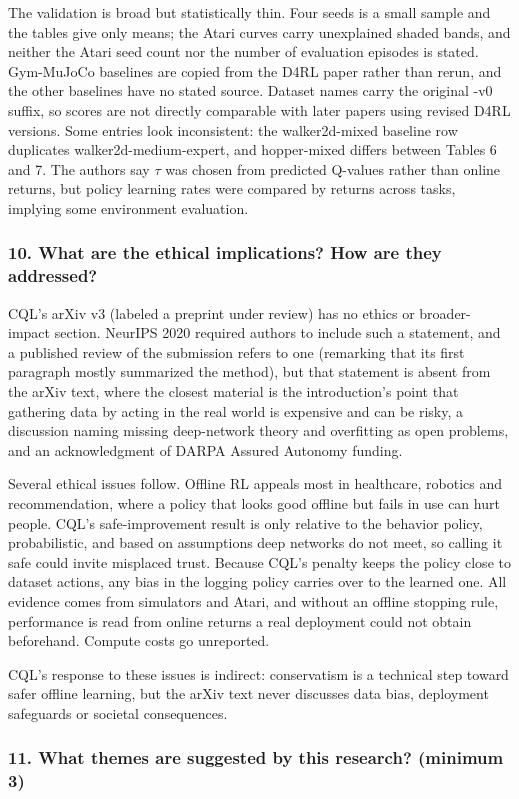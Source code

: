\documentclass[11pt]{article}
\newcommand{\question}[1]{\subsubsection*{#1}}
\begin{document}
The validation is broad but statistically thin. Four seeds is a small sample and the tables give only means; the Atari curves carry unexplained shaded bands, and neither the Atari seed count nor the number of evaluation episodes is stated. Gym-MuJoCo baselines are copied from the D4RL paper rather than rerun, and the other baselines have no stated source. Dataset names carry the original -v0 suffix, so scores are not directly comparable with later papers using revised D4RL versions. Some entries look inconsistent: the walker2d-mixed baseline row duplicates walker2d-medium-expert, and hopper-mixed differs between Tables 6 and 7. The authors say \ensuremath{\tau} was chosen from predicted Q-values rather than online returns, but policy learning rates were compared by returns across tasks, implying some environment evaluation.

\question{10. What are the ethical implications? How are they addressed?}

CQL's arXiv v3 (labeled a preprint under review) has no ethics or broader-impact section. NeurIPS 2020 required authors to include such a statement, and a published review of the submission refers to one (remarking that its first paragraph mostly summarized the method), but that statement is absent from the arXiv text, where the closest material is the introduction's point that gathering data by acting in the real world is expensive and can be risky, a discussion naming missing deep-network theory and overfitting as open problems, and an acknowledgment of DARPA Assured Autonomy funding.

Several ethical issues follow. Offline RL appeals most in healthcare, robotics and recommendation, where a policy that looks good offline but fails in use can hurt people. CQL's safe-improvement result is only relative to the behavior policy, probabilistic, and based on assumptions deep networks do not meet, so calling it safe could invite misplaced trust. Because CQL's penalty keeps the policy close to dataset actions, any bias in the logging policy carries over to the learned one. All evidence comes from simulators and Atari, and without an offline stopping rule, performance is read from online returns a real deployment could not obtain beforehand. Compute costs go unreported.

CQL's response to these issues is indirect: conservatism is a technical step toward safer offline learning, but the arXiv text never discusses data bias, deployment safeguards or societal consequences.

\question{11. What themes are suggested by this research? (minimum 3)}
\end{document}
